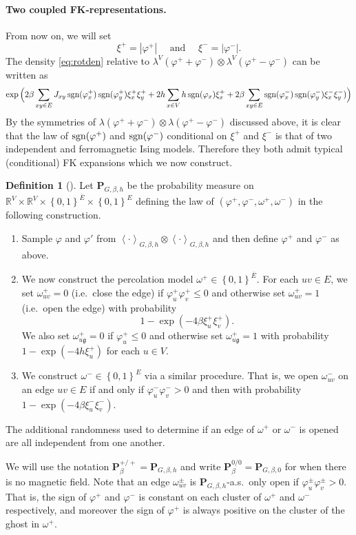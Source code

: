 \documentclass{article}
\numberwithin{equation}{section}
\theoremstyle{definition}
\theoremstyle{definition}
\newtheorem{definition}{Definition}
\theoremstyle{remark}
\DeclareMathOperator{\sgn}{\textnormal{sgn}}
\newcommand\vp{\varphi}
\newcommand\R{\mathbb{R}}
\newcommand{\w}{\omega}
\renewcommand{\l}{\lambda}
\newcommand{\vpp}{\vp^+}
\newcommand{\vpm}{\vp^-}
\renewcommand{\P}{\mathrm{\mathbf{P}}}
\renewcommand{\L}{\xi}
\newcommand{\Lp}{\xi^+}
\newcommand{\Lm}{\xi^-}
\newcommand{\g}{\mathfrak{g}}
\begin{document}
\paragraph{Two coupled FK-representations. }
From now on, we will set 
\[
\L^+ = |\vpp| \quad\text{ and }\quad \L^- = |\vpm|.
\]
The density \eqref{eq:rotden} relative to $\l^V(\vpp+\vpm)\otimes\l^V(\vpp-\vpm)$ can be written as
\[
	\exp\Big( 2\beta \sum_{xy \in E} J_{xy} \sgn(\vpp_x) \sgn(\vpp_y) \Lp_x \Lp_y + 2h\sum_{x \in V}h\sgn(\vp_x) \Lp_x + 2\beta \sum_{xy \in E} \sgn(\vpm_x) \sgn(\vpm_y) \Lm_x \Lm_y)\Big) 
\] 
By the symmetries of $\l(\vpp + \vpm) \otimes \l(\vpp - \vpm)$ discussed above, it is clear that the law of $\sgn(\vpp)$ and $\sgn(\vpm)$ conditional on $\Lp$ and $\Lm$ is that of two independent and ferromagnetic Ising models. Therefore they both admit typical (conditional) FK expansions which we now construct. 
\begin{definition}[]\label{def:def}
	Let $\P_{G,\beta,h}$ be the probability measure on $\R^V \times \R^V \times \left\{ 0,1 \right\}^{ \overline{E}} \times \left\{ 0,1 \right\}^E$ defining the law of $(\vpp,\vpm,\w^+,\w^-)$ in the following construction. 
	\begin{enumerate}[(1)]
	\item Sample $\vp$ and $\vp'$ from $\left< \cdot \right>_{G,\beta,h} \otimes \left< \cdot \right>_{G,\beta,h}$ and then define $\vp^+$ and $\vp^-$ as above. 
	\item We now construct the percolation model $\w^+ \in \left\{ 0,1 \right\}^{ \overline{E}}$. For each $uv \in E$, we set $\w^+_{uv} = 0$ (i.e.~close the edge) if $\vpp_u\vpp_v \leq 0$ and otherwise set $\w^+_{uv} = 1$ (i.e.~open the edge) with probability
		\[
			1 - \exp(-4\beta \xi^+_u \xi^+_v).
		\] 
		We also set $\w^+_{u\g} = 0$ if $\vpp_u \leq 0$ and otherwise set $\w^+_{u\g} = 1$ with probability $1-\exp(-4h\xi^+_u)$ for each $u \in V$. 
	\item We construct $\w^- \in \left\{ 0,1 \right\}^E$ via a similar procedure. That is, we open $\w^-_{uv}$ on an edge $uv \in E$ if and only if $\vp^-_u\vp^-_v > 0$ and then with probability $1 - \exp(-4\beta\xi^-_u\xi^-_v)$.
	\end{enumerate}
	The additional randomness used to determine if an edge of $\w^+$ or $\w^-$ is opened are all independent from one another.
\end{definition}
\noindent We will use the notation $\P^{+ / +}_\beta = \P_{G,\beta,h}$ and write $\P^{0 / 0}_\beta = \P_{G,\beta,0}$ for when there is no magnetic field. 
Note that an edge $\w^\pm_{uv}$ is $\P_{G,\beta,h}$-a.s.~only open if $\vp^\pm_u\vp^\pm_v > 0$. That is, the sign of $\vp^+$ and $\vp^-$ is constant on each cluster of $\w^+$ and $\w^-$ respectively, and moreover the sign of $\vp^+$ is always positive on the cluster of the ghost in $\w^+$.
\end{document}
